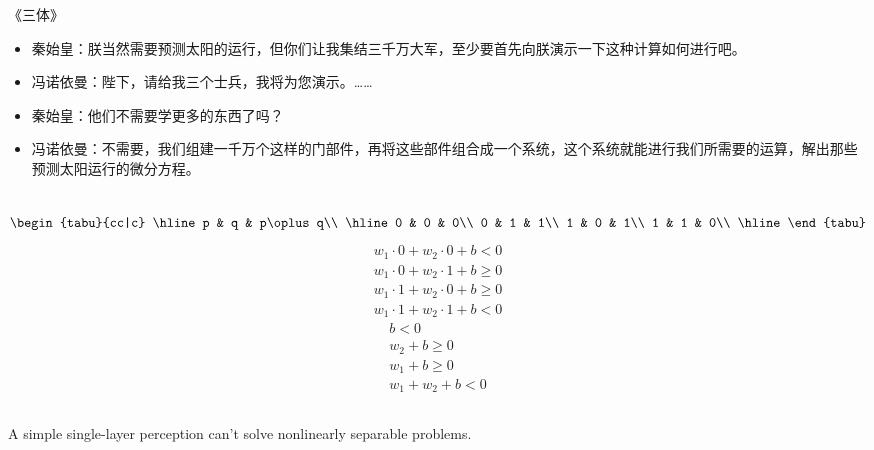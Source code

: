 \documentclass[UTF8,aspectratio=43,11pt,colorlinks,compress,openany]{beamer}%
\begin{document}
\begin{frame}\frametitle{}
\begin{block}{《三体》}
\begin{itemize}
	\item 秦始皇：朕当然需要预测太阳的运行，但你们让我集结三千万大军，至少要首先向朕演示一下这种计算如何进行吧。
	\item 冯诺依曼：陛下，请给我三个士兵，我将为您演示。……
	\item 秦始皇：他们不需要学更多的东西了吗？
	\item 冯诺依曼：不需要，我们组建一千万个这样的门部件，再将这些部件组合成一个系统，这个系统就能进行我们所需要的运算，解出那些预测太阳运行的微分方程。
\end{itemize}
\end{block}
\begin{columns}	
\[\begin{tabu}{cc|c}
	\hline
	p & q & p\oplus q\\
	\hline
	0 & 0 & 0\\
	0 & 1 & 1\\
	1 & 0 & 1\\
	1 & 1 & 0\\
	\hline
\end{tabu}\]
\begin{align*}
w_1\cdot 0+w_2\cdot 0+b<0\\
w_1\cdot 0+w_2\cdot 1+b\geq 0\\
w_1\cdot 1+w_2\cdot 0+b\geq 0\\
w_1\cdot 1+w_2\cdot 1+b<0
\end{align*}
\begin{align*}
b<0\\
w_2+b\geq 0\\
w_1+b\geq 0\\
w_1+w_2+b<0
\end{align*}
\end{columns}\vspace*{7pt}
A simple single-layer perception can't solve nonlinearly separable problems.
\end{frame}
\end{document}
